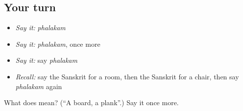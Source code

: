 \subsection*{Your turn}
\begin{itemize}
\raggedright
  \item \emph{Say it:} \emph{phalakam}
  \item \emph{Say it:} \emph{phalakam}, once more
  \item \emph{Say it:} say \emph{phalakam}
  \item \emph{Recall:} say the Sanskrit for a room, then the Sanskrit for a chair, then say \emph{phalakam} again
\end{itemize}

\begin{tcolorbox}[breakable,colback=teal!4,colframe=teal!35!black,title={Before you move on}]
What does  mean? (\textquotedblleft{}A board, a plank\textquotedblright{}.) Say it once more.
\end{tcolorbox}
